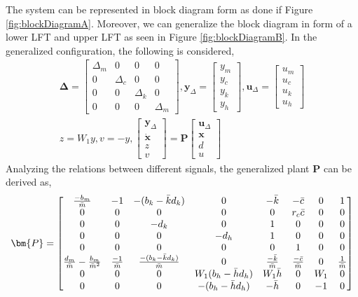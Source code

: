 The system can be represented in block diagram form as done if Figure \ref{fig:blockDiagramA}. Moreover, we can generalize the block diagram in form of a lower LFT and upper LFT as seen in Figure \ref{fig:blockDiagramB}. In the generalized configuration, the following is considered,
\begin{align*}
    \bm{\Delta} =
    \begin{bmatrix}
        \Delta_m & 0 & 0 & 0\\
        0 & \Delta_c & 0 & 0\\
        0 & 0 & \Delta_k & 0\\
        0 & 0 & 0 & \Delta_m
    \end{bmatrix},
    \bm{y}_\Delta = \begin{bmatrix}
        y_m\\
        y_c\\
        y_k\\
        y_h
    \end{bmatrix},
    \bm{u}_\Delta = \begin{bmatrix}
        u_m\\
        u_c\\
        u_k\\
        u_h
    \end{bmatrix}\\
    z = W_1y, v = -y,
    \begin{bmatrix}
        \bm{y}_\Delta\\
        \dot{\bm{x}}\\
        z\\
        v
    \end{bmatrix} = 
    \bm{P}\begin{bmatrix}
        \bm{u}_\Delta\\
        \bm{x}\\
        d\\
        u
    \end{bmatrix}
\end{align*}
Analyzing the relations between different signals, the generalized plant $\mathbf{P}$ can be derived as,
\begin{align*}
    \bm{P} = 
    \begin{bmatrix}
        \frac{-b_m}{\Bar{m}} & -1 & -(b_k-\Bar{k}d_k) & 0 & -\Bar{k} & -\Bar{c} & 0 & 1\\
        0 & 0 & 0 & 0 & 0 & r_c\Bar{c} & 0 & 0\\
        0 & 0 & -d_k & 0 & 1 & 0 & 0 & 0\\
        0 & 0 & 0 & -d_h & 1 & 0 & 0 & 0\\
        0 & 0 & 0 & 0 & 0 & 1 & 0 & 0\\
        \frac{d_m}{\Bar{m}} - \frac{b_m}{\Bar{m}^2} & \frac{-1}{\Bar{m}} & \frac{-(b_k-\Bar{k}d_k)}{\Bar{m}} & 0 & \frac{-\Bar{k}}{\Bar{m}} & \frac{-\Bar{c}}{\Bar{m}} & 0 & \frac{1}{\Bar{m}}\\
        0 & 0 & 0 & W_1(b_h-\Bar{h}d_h) & W_1\Bar{h} & 0 & W_1 & 0\\
        0 & 0 & 0 & -(b_h-\Bar{h}d_h) & -\Bar{h} & 0 & -1 & 0
    \end{bmatrix}
\end{align*}
